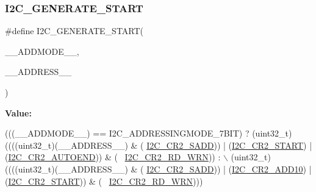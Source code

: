 \subsubsection{\texorpdfstring{I2\+C\+\_\+\+G\+E\+N\+E\+R\+A\+T\+E\+\_\+\+S\+T\+A\+RT}{I2C\_GENERATE\_START}}
{\footnotesize\ttfamily \#define I2\+C\+\_\+\+G\+E\+N\+E\+R\+A\+T\+E\+\_\+\+S\+T\+A\+RT(\begin{DoxyParamCaption}\item[{}]{\+\_\+\+\_\+\+A\+D\+D\+M\+O\+D\+E\+\_\+\+\_\+,  }\item[{}]{\+\_\+\+\_\+\+A\+D\+D\+R\+E\+S\+S\+\_\+\+\_\+ }\end{DoxyParamCaption})}

{\bfseries Value\+:}
\begin{DoxyCode}
(((\_\_ADDMODE\_\_) == I2C\_ADDRESSINGMODE\_7BIT) ? (uint32\_t)((((uint32\_t)(\_\_ADDRESS\_\_) & (
      \hyperlink{group___peripheral___registers___bits___definition_ga1a0478d3d85fc6aba608390ee2ea2d1c}{I2C\_CR2\_SADD})) | (\hyperlink{group___peripheral___registers___bits___definition_ga5ac78b87a12a9eaf564f5a3f99928478}{I2C\_CR2\_START}) | (\hyperlink{group___peripheral___registers___bits___definition_gabcf789c74e217ec8967bcabc156a6c54}{I2C\_CR2\_AUTOEND})) & (~
      \hyperlink{group___peripheral___registers___bits___definition_ga268ec714bbe4a75ea098c0e230a87697}{I2C\_CR2\_RD\_WRN})) : \(\backslash\)
                                                          (uint32\_t)((((uint32\_t)(\_\_ADDRESS\_\_) & (
      \hyperlink{group___peripheral___registers___bits___definition_ga1a0478d3d85fc6aba608390ee2ea2d1c}{I2C\_CR2\_SADD})) | (\hyperlink{group___peripheral___registers___bits___definition_ga5454de5709c0e68a0068f9f5d39e5674}{I2C\_CR2\_ADD10}) | (\hyperlink{group___peripheral___registers___bits___definition_ga5ac78b87a12a9eaf564f5a3f99928478}{I2C\_CR2\_START})) & (~
      \hyperlink{group___peripheral___registers___bits___definition_ga268ec714bbe4a75ea098c0e230a87697}{I2C\_CR2\_RD\_WRN})))
\end{DoxyCode}
\mbox{\label{group___i2_c___private___macro_ga14b20c50be9fcafef1ce2f0b962b39a9}} 
